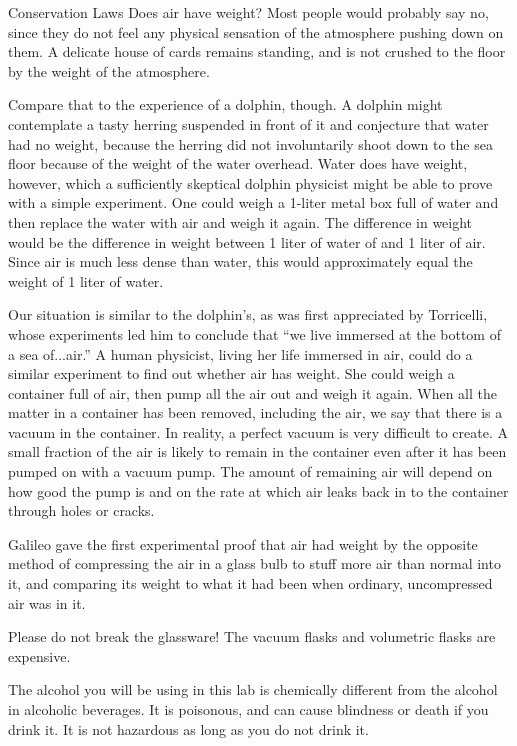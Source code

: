 \begin{lab}{Conservation Laws}
Does air have weight?  Most people would probably say no,
since they do not feel any physical sensation of the
atmosphere pushing down on them.  A delicate house of cards
remains standing, and is not crushed to the floor by the
weight of the atmosphere.

Compare that to the experience of a dolphin, though.  A
dolphin might contemplate a tasty herring suspended in front
of it and conjecture that water had no weight, because the
herring did not involuntarily shoot down to the sea floor
because of the weight of the water overhead.  Water does
have weight, however, which a sufficiently skeptical dolphin
physicist might be able to prove with a simple experiment. 
One could weigh a 1-liter metal box full of water and then
replace the water with air and weigh it again.  The
difference in weight would be the difference in weight
between 1 liter of water of and 1 liter of air.  Since air
is much less dense than water, this would approximately
equal the weight of 1 liter of water.

Our situation is similar to the dolphin's, as was first
appreciated by Torricelli, whose experiments led him to
conclude that ``we live immersed at the bottom of a sea
of...air.''  A human physicist, living her life immersed in
air, could do a similar experiment to find out whether air
has weight.  She could weigh a container full of air, then
pump all the air out and weigh it again.  When all the
matter in a container has been removed, including the air,
we say that there is a vacuum in the container.  In
reality, a perfect vacuum is very difficult to create.  A
small fraction of the air is likely to remain in the
container even after it has been pumped on with a vacuum
pump.  The amount of remaining air will depend on how good
the pump is and on the rate at which air leaks back in to
the container through holes or cracks.

Galileo gave the first experimental proof that air had
weight by the opposite method of compressing the air in a
glass bulb to stuff more air than normal into it, and
comparing its weight to what it had been when ordinary,
uncompressed air was in it.


Please do not break the glassware!  The vacuum flasks and
volumetric flasks are expensive.

The alcohol you will be using in this lab is chemically
different from the alcohol in alcoholic beverages.  It is
poisonous, and can cause blindness or death if you drink it.
 It is not hazardous as long as you do not drink it.


\end{lab}
